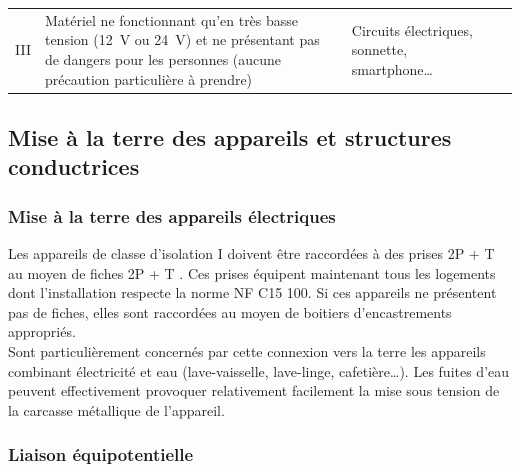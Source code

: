 \begin{xltabular}{\textwidth}{c X p{3cm} p{2cm} c}
\addlinespace
III		& Matériel ne fonctionnant qu'en très basse tension (\SI{12}{\volt}	ou \SI{24}{\volt}) et ne présentant pas de dangers pour les personnes (aucune précaution particulière à prendre)			& Circuits électriques, sonnette, smartphone\ldots		& 		& 
\end{xltabular}

\subsection{Mise à la terre des appareils et structures conductrices}

\subsubsection{Mise à la terre des appareils électriques}

Les appareils de classe d'isolation I doivent être raccordées à des prises 2P + T  au moyen de fiches 2P + T . Ces prises équipent maintenant tous les logements dont l'installation respecte la norme NF C15 100. Si ces appareils ne présentent pas de fiches, elles sont raccordées au moyen de boitiers d'encastrements appropriés.\\
Sont particulièrement concernés par cette connexion vers la terre les appareils combinant électricité et eau (lave-vaisselle, lave-linge, cafetière\ldots {}). Les fuites d'eau peuvent effectivement  provoquer relativement facilement la mise sous tension de la carcasse métallique de l'appareil.

\subsubsection{Liaison équipotentielle}

